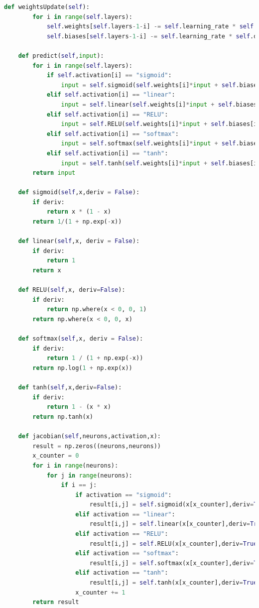\documentclass{article}
\begin{document}
\begin{lstlisting}[language=python]
    def weightsUpdate(self):
        for i in range(self.layers):
            self.weights[self.layers-1-i] -= self.learning_rate * self.deltas[i] * self.outputs[-2-i].T
            self.biases[self.layers-1-i] -= self.learning_rate * self.deltas[i]
    
    def predict(self,input):
        for i in range(self.layers):
            if self.activation[i] == "sigmoid":
                input = self.sigmoid(self.weights[i]*input + self.biases[i])
            elif self.activation[i] == "linear":
                input = self.linear(self.weights[i]*input + self.biases[i])
            elif self.activation[i] == "RELU":
                input = self.RELU(self.weights[i]*input + self.biases[i])
            elif self.activation[i] == "softmax":
                input = self.softmax(self.weights[i]*input + self.biases[i])
            elif self.activation[i] == "tanh":
                input = self.tanh(self.weights[i]*input + self.biases[i])
        return input
        
    def sigmoid(self,x,deriv = False):
        if deriv:
            return x * (1 - x)
        return 1/(1 + np.exp(-x))
    
    def linear(self,x, deriv = False):
        if deriv:
            return 1
        return x
    
    def RELU(self,x, deriv=False):
        if deriv:
            return np.where(x < 0, 0, 1)
        return np.where(x < 0, 0, x)
    
    def softmax(self,x, deriv = False):
        if deriv:
            return 1 / (1 + np.exp(-x))
        return np.log(1 + np.exp(x))
    
    def tanh(self,x,deriv=False):
        if deriv:
            return 1 - (x * x)
        return np.tanh(x)
        
    def jacobian(self,neurons,activation,x):
        result = np.zeros((neurons,neurons))
        x_counter = 0
        for i in range(neurons):
            for j in range(neurons):
                if i == j:
                    if activation == "sigmoid":
                        result[i,j] = self.sigmoid(x[x_counter],deriv=True)
                    elif activation == "linear":
                        result[i,j] = self.linear(x[x_counter],deriv=True)
                    elif activation == "RELU":
                        result[i,j] = self.RELU(x[x_counter],deriv=True)
                    elif activation == "softmax":
                        result[i,j] = self.softmax(x[x_counter],deriv=True)
                    elif activation == "tanh":
                        result[i,j] = self.tanh(x[x_counter],deriv=True)
                    x_counter += 1
        return result
\end{lstlisting}
\end{document}
